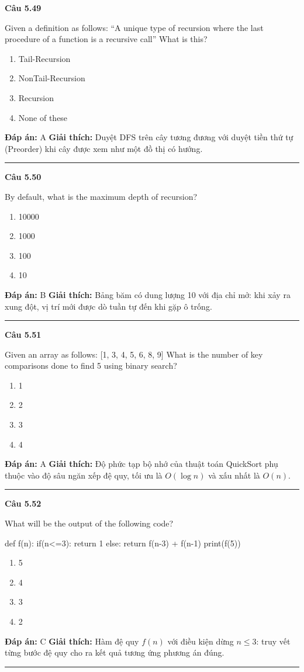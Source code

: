 \documentclass[11pt,a4paper]{article}
\newenvironment{question}[1]{%
  \par\vspace{1em}\noindent\textbf{\large Câu #1}\par\vspace{0.4em}
}{%
  \par\vspace{1em}\hrule\vspace{0.6em}
}
\newenvironment{choices}{%
  \begin{enumerate}[label=\textbf{\Alph*.},leftmargin=2.2em,itemsep=2pt,topsep=3pt]
}{%
  \end{enumerate}
}
\newcommand{\choice}{\item}
\newenvironment{codebox}{%
  \begin{tcolorbox}[colback=gray!8!white,colframe=gray!50!black,arc=1.5mm,boxrule=0.6pt,left=3mm,right=3mm,top=2.5mm,bottom=2.5mm]
  \ttfamily\small
}{%
  \end{tcolorbox}
}
\begin{document}
\begin{question}{5.49}
Given a definition as follows: ``A unique type of recursion where the last procedure of a function is a recursive call'' What is this?
\begin{choices}
\choice Tail-Recursion
\choice NonTail-Recursion
\choice Recursion
\choice None of these
\end{choices}
\textbf{Đáp án:} A
\textbf{Giải thích:} Duyệt DFS trên cây tương đương với duyệt tiền thứ tự (Preorder) khi cây được xem như một đồ thị có hướng.
\end{question}

\begin{question}{5.50}
By default, what is the maximum depth of recursion?
\begin{choices}
\choice 10000
\choice 1000
\choice 100
\choice 10
\end{choices}
\textbf{Đáp án:} B
\textbf{Giải thích:} Bảng băm có dung lượng 10 với địa chỉ mở: khi xảy ra xung đột, vị trí mới được dò tuần tự đến khi gặp ô trống.
\end{question}

\begin{question}{5.51}
Given an array as follows: [1, 3, 4, 5, 6, 8, 9] What is the number of key comparisons done to find 5 using binary search?
\begin{choices}
\choice 1
\choice 2
\choice 3
\choice 4
\end{choices}
\textbf{Đáp án:} A
\textbf{Giải thích:} Độ phức tạp bộ nhớ của thuật toán QuickSort phụ thuộc vào độ sâu ngăn xếp đệ quy, tối ưu là $O(\log n)$ và xấu nhất là $O(n)$.
\end{question}

\begin{question}{5.52}
What will be the output of the following code?
\begin{codebox}
def f(n):
    if(n<=3):
        return 1
    else:
        return f(n-3) + f(n-1)
print(f(5))
\end{codebox}
\begin{choices}
\choice 5
\choice 4
\choice 3
\choice 2
\end{choices}
\textbf{Đáp án:} C
\textbf{Giải thích:} Hàm đệ quy $f(n)$ với điều kiện dừng $n \le 3$: truy vết từng bước đệ quy cho ra kết quả tương ứng phương án đúng.
\end{question}
\end{document}

